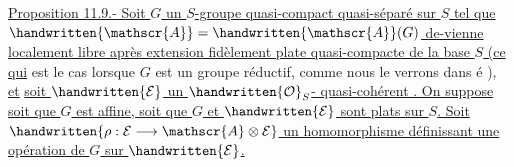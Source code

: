 \uline{Proposition 11.9.- Soit $G$ un $S$-groupe quasi-compact quasi-séparé sur $S$ tel que $\handwritten{\mathscr{A}}=\handwritten{\mathscr{A}}(G)$ de-\linebreak vienne localement libre après extension fidèlement plate quasi-compacte de la base $S$ (ce qui} est le cas lorsque $G$ est un groupe réductif, comme nous le verrons dans é ), \uline{et} \uline{soit $\handwritten{\mathcal{E}}$ un $\handwritten{\mathcal{O}}_S$- quasi-cohérent . On suppose soit que $G$ est affine, soit que $G$ et $\handwritten{\mathcal{E}}$ sont plats sur $S$. Soit $\handwritten{\rho:\mathcal{E}\longrightarrow\mathscr{A}\otimes\mathcal{E}}$ un homomorphisme définissant une opération de $G$ sur $\handwritten{\mathcal{E}}$.}
